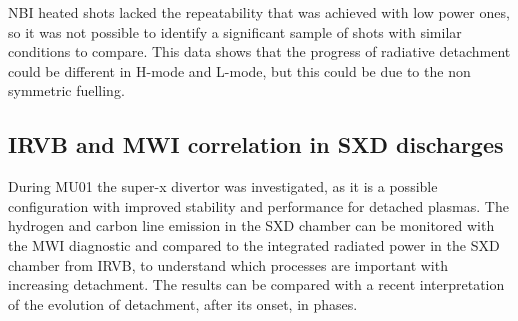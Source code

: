 NBI heated shots lacked the repeatability that was achieved with low power ones, so it was not possible to identify a significant sample of shots with similar conditions to compare. This data shows that the progress of radiative detachment could be different in H-mode and L-mode, but this could be due to the non symmetric fuelling. 


\subsection{IRVB and MWI correlation in SXD discharges}\label{SXD discharges}

During MU01 the super-x divertor was investigated, as it is a possible configuration with improved stability and performance for detached plasmas. The hydrogen and carbon line emission in the SXD chamber can be monitored with the MWI diagnostic and compared to the integrated radiated power in the SXD chamber from IRVB, to understand which processes are important with increasing detachment. The results can be compared with a recent interpretation of the evolution of detachment, after its onset, in phases.\cite{Verhaegh2022}


